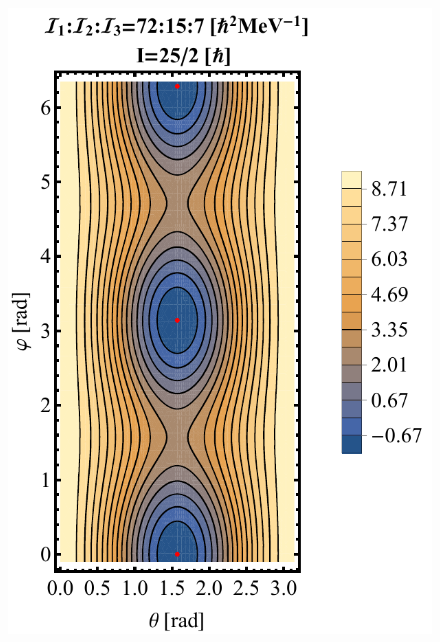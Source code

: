 \documentclass[11pt]{article}
\begin{document}
\begin{figure}
\centering
\begin{minipage}{.5\textwidth}
  \centering
  \includegraphics[scale=0.5]{figs/contour-tsd1.pdf}
\end{minipage}%
\begin{minipage}{.5\textwidth}
  \centering

\end{minipage}
\end{figure}
\end{document}
